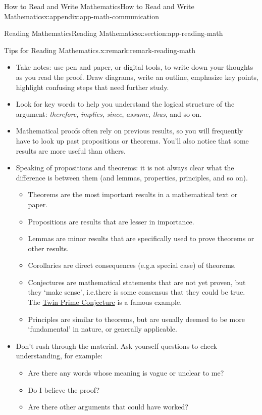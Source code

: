 \documentclass[oneside,10pt,]{book}
\numberwithin{equation}{section}
\begin{document}
\begin{appendixptx}{How to Read and Write Mathematics}{}{How to Read and Write Mathematics}{}{}{x:appendix:app-math-communication}
\begin{sectionptx}{Reading Mathematics}{}{Reading Mathematics}{}{}{x:section:app-reading-math}
\begin{remark}{Tips for Reading Mathematics.}{x:remark:remark-reading-math}%
%
\begin{itemize}[label=\textbullet]
\item{}Take notes: use pen and paper, or digital tools, to write down your thoughts as you read the proof. Draw diagrams, write an outline, emphasize key points, highlight confusing steps that need further study.%
\item{}Look for key words to help you understand the logical structure of the argument: \emph{therefore}, \emph{implies}, \emph{since}, \emph{assume}, \emph{thus}, and so on.%
\item{}Mathematical proofs often rely on previous results, so you will frequently have to look up past propositions or theorems. You'll also notice that some results are more useful than others.%
\item{}Speaking of propositions and theorems: it is not always clear what the difference is between them (and lemmas, properties, principles, and so on\textellipsis{}).%
\begin{itemize}[label=$\circ$]
\item{}Theorems are the most important results in a mathematical text or paper.%
\item{}Propositions are results that are lesser in importance.%
\item{}Lemmas are minor results that are specifically used to prove theorems or other results.%
\item{}Corollaries are direct consequences (e.g.\@ a special case) of theorems.%
\item{}Conjectures are mathematical statements that are not yet proven, but they `make sense', i.e.\@ there is some consensus that they could be true. The \href{https://mathworld.wolfram.com/TwinPrimeConjecture.html}{Twin Prime Conjecture} is a famous example.%
\item{}Principles are similar to theorems, but are usually deemed to be more `fundamental' in nature, or generally applicable.%
\end{itemize}
%
\item{}Don't rush through the material. Ask yourself questions to check understanding, for example:%
\begin{itemize}[label=$\circ$]
\item{}Are there any words whose meaning is vague or unclear to me?%
\item{}Do I believe the proof?%
\item{}Are there other arguments that could have worked?%

\end{itemize}
\end{itemize}
\end{remark}
\end{sectionptx}
\end{appendixptx}
\end{document}
